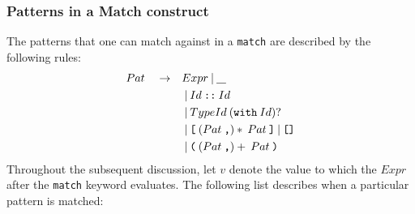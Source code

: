 \documentclass[a4paper, 12pt]{article}
\theoremstyle{myplain}
\theoremstyle{mydefinition}
\theoremstyle{myremark}
\numberwithin{equation} {section}
\numberwithin{figure}   {section}
\numberwithin{table}    {section}
\newcommand{\sepbar}{\: | \:}	%
\newcommand{\substo}{\quad\rightarrow\quad}
\newcommand{\uscore}{\underline{\hspace{0.3cm}}}
\begin{document}
\subsubsection{Patterns in a Match construct}\label{expr:pat}
The patterns that one can match against in a \texttt{match} are described by the following rules:
\begin{align*}
Pat \substo& Expr \sepbar \uscore\\
& \sepbar Id\:\texttt{::}\: Id\\
& \sepbar TypeId \: (\texttt{with}\: Id)?\\
& \sepbar \texttt{[} \: ( Pat\:\texttt{,})*\: Pat \: \texttt{]} \sepbar  \texttt{[]}\\
& \sepbar \texttt{(} \: ( Pat\:\texttt{,})+\: Pat\: \texttt{)}
\end{align*}
Throughout the subsequent discussion, let $v$ denote the value to which the $Expr$ after the \texttt{match} keyword evaluates. The following list describes when a particular pattern is matched:
\end{document}
